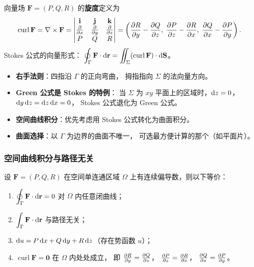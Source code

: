 \documentclass{article}
\DeclareMathOperator{\curl}{curl}
\begin{document}
\begin{remark}[旋度]
  向量场 $\mathbf{F} = (P, Q, R)$ 的\textbf{旋度}定义为
  \[
    \curl \mathbf{F}
    = \nabla \times \mathbf{F}
    =
    \begin{vmatrix}
      \mathbf{i} & \mathbf{j} & \mathbf{k} \\
      \pdfFrac{}{x} & \pdfFrac{}{y} & \pdfFrac{}{z} \\
      P & Q & R
    \end{vmatrix}
    = \left(\pdfFrac{R}{y}-\pdfFrac{Q}{z},\;
      \pdfFrac{P}{z}-\pdfFrac{R}{x},\;
    \pdfFrac{Q}{x}-\pdfFrac{P}{y}\right).
  \]
  Stokes 公式的向量形式：
  $\displaystyle\oint_\Gamma \mathbf{F} \cdot \dif\mathbf{r}
  = \iint_\Sigma (\curl \mathbf{F}) \cdot \dif\mathbf{S}$。
\end{remark}

\begin{remark}
  \begin{itemize}
    \item \textbf{右手法则}：四指沿 $\Gamma$ 的正向弯曲，
      拇指指向 $\Sigma$ 的法向量方向。
    \item \textbf{Green 公式是 Stokes 的特例}：
      当 $\Sigma$ 为 $xy$ 平面上的区域时，$\mathrm{d} z = 0$，
      $\mathrm{d} y\,\mathrm{d} z = \mathrm{d} z\,\mathrm{d} x = 0$，
      Stokes 公式退化为 Green 公式。
    \item \textbf{空间曲线积分}：优先考虑用 Stokes 公式转化为曲面积分。
    \item \textbf{曲面选择}：以 $\Gamma$ 为边界的曲面不唯一，
      可选最方便计算的那个（如平面片）。
  \end{itemize}
\end{remark}

\subsubsection*{空间曲线积分与路径无关}

\begin{corollary}[空间积分与路径无关]
  设 $\mathbf{F} = (P, Q, R)$ 在空间单连通区域 $\Omega$ 上有连续偏导数，则以下等价：
  \begin{enumerate}
    \item $\displaystyle\oint_\Gamma \mathbf{F}\cdot\mathrm{d}\mathbf{r} = 0$
      对 $\Omega$ 内任意闭曲线；
    \item $\displaystyle\int_\Gamma \mathbf{F}\cdot\mathrm{d}\mathbf{r}$ 与路径无关；
    \item $\mathrm{d} u = P\,\mathrm{d} x + Q\,\mathrm{d} y + R\,\mathrm{d} z$（存在势函数 $u$）；
    \item $\curl \mathbf{F} = \mathbf{0}$ 在 $\Omega$ 内处处成立，
      即 $\frac{\partial R}{\partial y}=\frac{\partial Q}{\partial z}$，
      $\frac{\partial P}{\partial z}=\frac{\partial R}{\partial x}$，
      $\frac{\partial Q}{\partial x}=\frac{\partial P}{\partial y}$。
  \end{enumerate}
\end{corollary}
\end{document}
